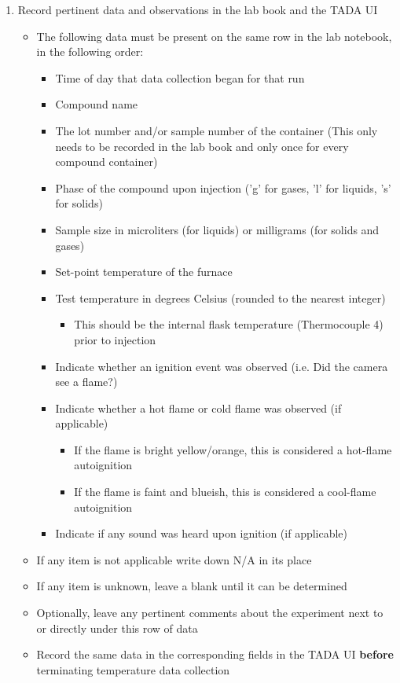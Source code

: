 \documentclass[letterpaper,11pt]{article}
\begin{document}
\begin{enumerate}
    \item Record pertinent data and observations in the lab book and the 
        TADA UI
        \begin{itemize}
        \item The following data must be present on the same row in the lab 
            notebook, in the following order:
            \begin{itemize}
            \item Time of day that data collection began for that run
            \item Compound name 
            \item The lot number and/or sample number of the 
                container (This only needs to be recorded in the lab book  and 
                only once for every compound container)
            \item Phase of the compound upon injection ('g' for gases, 'l' for 
                liquids, 's' for solids)
            \item Sample size in microliters (for liquids) or milligrams
                (for solids and gases)
            \item Set-point temperature of the furnace
            \item Test temperature in degrees Celsius (rounded to the 
                nearest integer)
                \begin{itemize}
                \item This should be the internal flask temperature 
                    (Thermocouple 4) prior to injection
                \end{itemize}
            \item Indicate whether an ignition event was observed (i.e. Did 
                the camera see a flame?)
            \item Indicate whether a hot flame or cold flame was observed (if 
                applicable)
                \begin{itemize}
                \item If the flame is bright yellow/orange, this is considered a 
                    hot-flame autoignition
                \item If the flame is faint and blueish, this is considered a 
                    cool-flame autoignition
                \end{itemize}
            \item Indicate if any sound was heard upon ignition (if applicable)
            \end{itemize}
        \item If any item is not applicable write down N/A in its place
        \item If any item is unknown, leave a blank until it can be determined
        \item Optionally, leave any pertinent comments about the experiment
            next to or directly under this row of data
        \item Record the same data in the corresponding fields in the TADA UI
            \textbf{before} terminating temperature data collection
        \end{itemize}
        

\end{enumerate}
\end{document}
